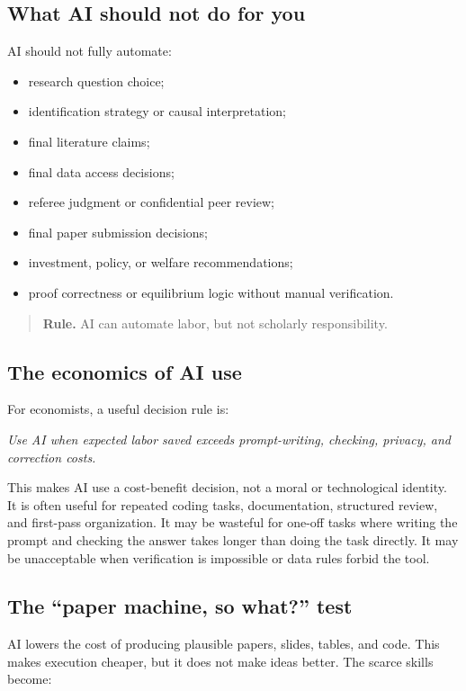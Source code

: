 \documentclass[11pt]{article}
\newcommand{\rulebox}[1]{\begin{quote}\noindent\textcolor{ruleblue}{\textbf{Rule.}} #1\end{quote}}
\begin{document}
\subsection{What AI should not do for you}

AI should not fully automate:

\begin{itemize}[leftmargin=2em]
  \item research question choice;
  \item identification strategy or causal interpretation;
  \item final literature claims;
  \item final data access decisions;
  \item referee judgment or confidential peer review;
  \item final paper submission decisions;
  \item investment, policy, or welfare recommendations;
  \item proof correctness or equilibrium logic without manual verification.
\end{itemize}

\rulebox{AI can automate labor, but not scholarly responsibility.}

\subsection{The economics of AI use}

For economists, a useful decision rule is:

\begin{center}
\textit{Use AI when expected labor saved exceeds prompt-writing, checking, privacy, and correction costs.}
\end{center}

This makes AI use a cost-benefit decision, not a moral or technological identity. It is often useful for repeated coding tasks, documentation, structured review, and first-pass organization. It may be wasteful for one-off tasks where writing the prompt and checking the answer takes longer than doing the task directly. It may be unacceptable when verification is impossible or data rules forbid the tool.

\subsection{The ``paper machine, so what?'' test}

AI lowers the cost of producing plausible papers, slides, tables, and code. This makes execution cheaper, but it does not make ideas better. The scarce skills become:
\end{document}
